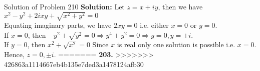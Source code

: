 \documentclass[aspectratio=169,8pt]{beamer}
\begin{document}
\begin{frame}{Solution of Problem 210}
  \textbf{Solution:} Let $z = x + iy$, then we have $x^2 - y^2 + 2ixy + \sqrt{x^2 + y^2} = 0$
  \\\vspace*{0.2cm}
  Equating imaginary parts, we have $2xy = 0$ i.e. either $x = 0$ or $y = 0$.
  \\\vspace*{0.2cm}
  If $x = 0$, then $-y^2 + \sqrt{y^2} = 0 \Rightarrow y^4 + y^2 = 0 \Rightarrow y = 0, y = \pm i$.
  \\\vspace*{0.2cm}
  If $y = 0$, then $x^2 + \sqrt{x^2} = 0$ Since $x$ is real only one solution is possible i.e. $x = 0$.
  \\\vspace*{0.2cm}
  Hence, $z = 0, \pm i$.
=======
  \textbf{203.}
>>>>>>> 426863a1114667eb4b135e7ded3a1478124afb30
\end{frame}
\end{document}
